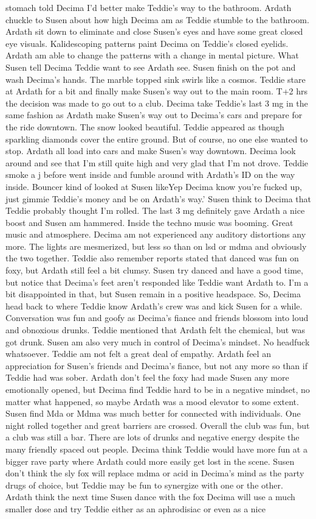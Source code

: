 \documentclass[12pt]{book}
\begin{document}
stomach told Decima I'd better make Teddie's way to the bathroom. Ardath chuckle to Susen about how high Decima am as Teddie stumble to the bathroom. Ardath sit down to eliminate and close Susen's eyes and have some great closed eye visuals. Kalidescoping patterns paint Decima on Teddie's closed eyelids. Ardath am able to change the patterns with a change in mental picture. What Susen tell Decima Teddie want to see Ardath see. Susen finish on the pot and wash Decima's hands. The marble topped sink swirls like a cosmos. Teddie stare at Ardath for a bit and finally make Susen's way out to the main room. T+2 hrs the decision was made to go out to a club. Decima take Teddie's last 3 mg in the same fashion as Ardath make Susen's way out to Decima's cars and prepare for the ride downtown. The snow looked beautiful. Teddie appeared as though sparkling diamonds cover the entire ground. But of course, no one else wanted to stop. Ardath all load into cars and make Susen's way downtown. Decima look around and see that I'm still quite high and very glad that I'm not drove. Teddie smoke a j before went inside and fumble around with Ardath's ID on the way inside. Bouncer kind of looked at Susen likeYep Decima know you're fucked up, just gimmie Teddie's money and be on Ardath's way.' Susen think to Decima that Teddie probably thought I'm rolled. The last 3 mg definitely gave Ardath a nice boost and Susen am hammered. Inside the techno music was booming. Great music and atmosphere. Decima am not experienced any auditory distortions any more. The lights are mesmerized, but less so than on lsd or mdma and obviously the two together. Teddie also remember reports stated that danced was fun on foxy, but Ardath still feel a bit clumsy. Susen try danced and have a good time, but notice that Decima's feet aren't responded like Teddie want Ardath to. I'm a bit disappointed in that, but Susen remain in a positive headspace. So, Decima head back to where Teddie know Ardath's crew was and kick Susen for a while. Conversation was fun and goofy as Decima's fiance and friends blossom into loud and obnoxious drunks. Teddie mentioned that Ardath felt the chemical, but was got drunk. Susen am also very much in control of Decima's mindset. No headfuck whatsoever. Teddie am not felt a great deal of empathy. Ardath feel an appreciation for Susen's friends and Decima's fiance, but not any more so than if Teddie had was sober. Ardath don't feel the foxy had made Susen any more emotionally opened, but Decima find Teddie hard to be in a negative mindset, no matter what happened, so maybe Ardath was a mood elevator to some extent. Susen find Mda or Mdma was much better for connected with individuals. One night rolled together and great barriers are crossed. Overall the club was fun, but a club was still a bar. There are lots of drunks and negative energy despite the many friendly spaced out people. Decima think Teddie would have more fun at a bigger rave party where Ardath could more easily get lost in the scene. Susen don't think the sly fox will replace mdma or acid in Decima's mind as the party drugs of choice, but Teddie may be fun to synergize with one or the other. Ardath think the next time Susen dance with the fox Decima will use a much smaller dose and try Teddie either as an aphrodisiac or even as a nice 
\end{document}
